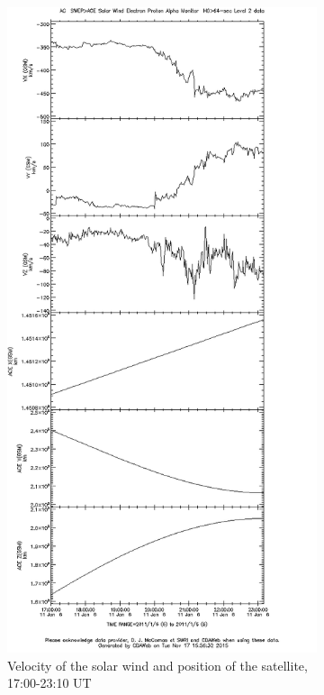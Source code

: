 \documentclass[10pt,a4paper]{article}
\begin{document}
\begin{figure}[h]
\begin{subfigure}[h]{.5\textwidth}
		\includegraphics[width=.8\linewidth]{ace-17-2310-v-s.png}
		\caption{Velocity of the solar wind and position of the satellite, 17:00-23:10 UT}
		\label{ace3}
	\end{subfigure}
	\begin{subfigure}[h]{.5\textwidth}
		\centering

\end{subfigure}
\end{figure}
\end{document}
